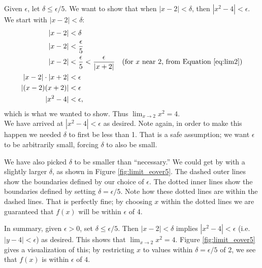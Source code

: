 \documentclass[10pt]{article}
\newcommand{\ds}{\displaystyle}
\begin{document}
Given $\epsilon$, let $\delta \leq \epsilon/5$. We want to show that when $|x-2|<\delta$, then $|x^2-4|<\epsilon$. We start with $|x-2|<\delta$:
\begin{align*}
|x-2| &< \delta \\
|x-2| &< \frac{\epsilon}5\\
|x-2| &< \frac\epsilon5 < \frac{\epsilon}{|x+2|} & \text{(for $x$ near 2, from Equation \eqref{eq:lim2})}\\
|x-2|\cdot |x+2| &< \epsilon\\
|(x-2)(x+2)| &< \epsilon\\
|x^2-4| &<\epsilon,
\end{align*}
which is what we wanted to show. Thus $\ds \lim_{x\to 2}x^2 = 4$.
\\
We have arrived at $|x^2 - 4|<\epsilon$ as desired.  Note again, in order to make this happen we needed $\delta$ to first be less than 1.  That is a safe assumption; we want $\epsilon$ to be arbitrarily small, forcing $\delta$ to also be small. 

We have also picked $\delta$ to be smaller than ``necessary.'' We could get by with a slightly larger $\delta$, as shown in Figure \ref{fig:limit_eover5}. The dashed outer lines show the boundaries defined by our choice of $\epsilon$. The dotted inner lines show the boundaries defined by setting $\delta = \epsilon/5$. Note how these dotted lines are within the dashed lines. That is perfectly fine; by choosing $x$ within the dotted lines we are guaranteed that $f(x)$ will be within $\epsilon$ of 4.%




In summary, given $\epsilon > 0$, set $\delta\leq\epsilon/5$.  Then $|x - 2| < \delta$ implies 
$|x^2 - 4|< \epsilon$ (i.e. $|y - 4|< \epsilon$) as desired.  This shows that $\displaystyle \lim_{x\rightarrow 2} x^2 = 4 $. Figure \ref{fig:limit_eover5} gives a visualization of this; by restricting $x$ to values within $\delta = \epsilon/5$ of 2, we see that $f(x)$ is within $\epsilon$ of $4$.
\end{document}
